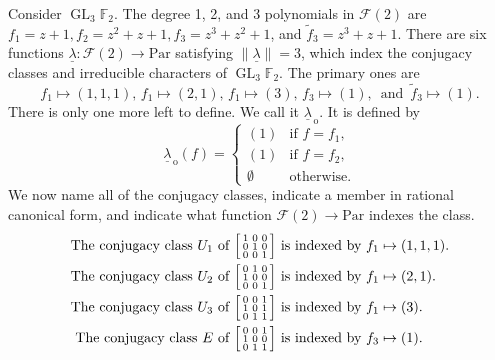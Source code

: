 \documentclass[Unicode,ALCO]{cedram}
\DeclareMathOperator{\GL}{GL}
\newcommand{\F}{\mathbb{F}}
\newcommand{\CF}{\mathcal{F}}
\newcommand{\Par}{\text{Par}}
\newcommand{\ulambda}{{\underline{\lambda}}}
\begin{document}
\begin{example}
\label{conj_class_example}
Consider $\GL_3 \F_2$.
The degree 1, 2, and 3 polynomials in $\CF (2)$ are
$f_1 = z+1, f_2 = z^2+z+1, f_3 = z^3+z^2+1$, and $\tilde{f}_3 = z^3+z+1$.
There are six functions $\ulambda : \CF (2) \to \Par$ satisfying $\| \ulambda \| = 3$, which index the conjugacy classes and irreducible characters of $\GL_3 \F_2$. The primary ones are
$$
f_1 \mapsto (1,1,1), \,
f_1 \mapsto (2,1), \,
f_1 \mapsto (3), \,
f_3 \mapsto (1), \,
\text{ and } \,
\tilde{f}_3 \mapsto (1).
$$
There is only one more left to define. We call it $\ulambda_{\,\mathrm{o}}$. It is defined by
$$ \ulambda_{\,\mathrm{o}} (f) =
\begin{cases}
(1) & \text{if } f = f_1, \\
(1) & \text{if } f = f_2, \\
\emptyset & \text{otherwise.}
\end{cases}
$$
We now name all of the conjugacy classes, indicate a member in rational canonical form, and indicate what function $\CF (2) \to \Par$ indexes the class.
\begin{align*}
\text{The conjugacy class } U_{1} \text{ of }
\begin{bsmallmatrix}
1 & 0 & 0 \\
0 & 1 & 0 \\
0 & 0 & 1
\end{bsmallmatrix}
&
\text{ is indexed by }
f_1 \mapsto (1,1,1). \\
\text{The conjugacy class } U_{2} \text{ of }
\begin{bsmallmatrix}
0 & 1 & 0 \\
1 & 0 & 0 \\
0 & 0 & 1
\end{bsmallmatrix}
&
\text{ is indexed by }
f_1 \mapsto (2,1). \\
\text{The conjugacy class } U_{3} \text{ of }
\begin{bsmallmatrix}
0 & 0 & 1 \\
1 & 0 & 1 \\
0 & 1 & 1
\end{bsmallmatrix}
&
\text{ is indexed by }
f_1 \mapsto (3). \\
\text{The conjugacy class } E \text{ of }
\begin{bsmallmatrix}
0 & 0 & 1 \\
1 & 0 & 0 \\
0 & 1 & 1
\end{bsmallmatrix}
&
\text{ is indexed by }
f_3 \mapsto (1). \\

\end{align*}
\end{example}
\end{document}

